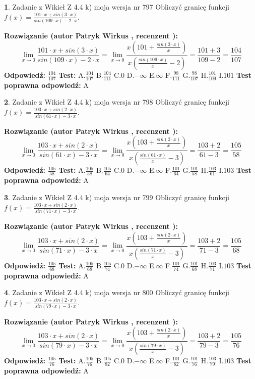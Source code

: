 \documentclass[12pt, a4paper]{article}
\theoremstyle{definition} %
\newtheorem{zad}{}
\newcommand{\zadStart}[1]{\begin{zad}#1\newline}
\newcommand{\zadStop}{\end{zad}}
\newcommand{\rozwStart}[2]{\noindent \textbf{Rozwiązanie (autor #1 , recenzent #2): }\newline}
\newcommand{\rozwStop}{\newline}
\newcommand{\odpStart}{\noindent \textbf{Odpowiedź:}\newline}
\newcommand{\odpStop}{\newline}
\newcommand{\testStart}{\noindent \textbf{Test:}\newline}
\newcommand{\testStop}{\newline}
\newcommand{\kluczStart}{\noindent \textbf{Test poprawna odpowiedź:}\newline}
\newcommand{\kluczStop}{\newline}
\begin{document}
\zadStart{Zadanie z Wikieł Z 4.4 k) moja wersja nr 797}
Obliczyć granicę funkcji $f(x)=\frac{101\cdot x +sin(3\cdot x)}{sin(109\cdot x) -2\cdot x}$.
\zadStop
\rozwStart{Patryk Wirkus}{}
$$\lim\limits_{x\to 0}\frac{101\cdot x +sin(3\cdot x)}{sin(109\cdot x) -2\cdot x}
=\lim\limits_{x\to 0}\frac{x(101+\frac{sin(3\cdot x)}{x})}{x(\frac{sin(109\cdot x)}{x}-2)}
=\frac{101+3}{109-2} = \frac{104}{107}$$
\rozwStop
\odpStart
$\frac{104}{107}$
\odpStop
\testStart
A.$\frac{104}{107}$
B.$\frac{104}{111}$
C.$0$
D.$-\infty$
E.$\infty$
F.$\frac{98}{111}$
G.$\frac{98}{107}$
H.$\frac{101}{109}$
I.$101$
\testStop
\kluczStart
A
\kluczStop



\zadStart{Zadanie z Wikieł Z 4.4 k) moja wersja nr 798}
Obliczyć granicę funkcji $f(x)=\frac{103\cdot x +sin(2\cdot x)}{sin(61\cdot x) -3\cdot x}$.
\zadStop
\rozwStart{Patryk Wirkus}{}
$$\lim\limits_{x\to 0}\frac{103\cdot x +sin(2\cdot x)}{sin(61\cdot x) -3\cdot x}
=\lim\limits_{x\to 0}\frac{x(103+\frac{sin(2\cdot x)}{x})}{x(\frac{sin(61\cdot x)}{x}-3)}
=\frac{103+2}{61-3} = \frac{105}{58}$$
\rozwStop
\odpStart
$\frac{105}{58}$
\odpStop
\testStart
A.$\frac{105}{58}$
B.$\frac{105}{64}$
C.$0$
D.$-\infty$
E.$\infty$
F.$\frac{101}{64}$
G.$\frac{101}{58}$
H.$\frac{103}{61}$
I.$103$
\testStop
\kluczStart
A
\kluczStop



\zadStart{Zadanie z Wikieł Z 4.4 k) moja wersja nr 799}
Obliczyć granicę funkcji $f(x)=\frac{103\cdot x +sin(2\cdot x)}{sin(71\cdot x) -3\cdot x}$.
\zadStop
\rozwStart{Patryk Wirkus}{}
$$\lim\limits_{x\to 0}\frac{103\cdot x +sin(2\cdot x)}{sin(71\cdot x) -3\cdot x}
=\lim\limits_{x\to 0}\frac{x(103+\frac{sin(2\cdot x)}{x})}{x(\frac{sin(71\cdot x)}{x}-3)}
=\frac{103+2}{71-3} = \frac{105}{68}$$
\rozwStop
\odpStart
$\frac{105}{68}$
\odpStop
\testStart
A.$\frac{105}{68}$
B.$\frac{105}{74}$
C.$0$
D.$-\infty$
E.$\infty$
F.$\frac{101}{74}$
G.$\frac{101}{68}$
H.$\frac{103}{71}$
I.$103$
\testStop
\kluczStart
A
\kluczStop



\zadStart{Zadanie z Wikieł Z 4.4 k) moja wersja nr 800}
Obliczyć granicę funkcji $f(x)=\frac{103\cdot x +sin(2\cdot x)}{sin(79\cdot x) -3\cdot x}$.
\zadStop
\rozwStart{Patryk Wirkus}{}
$$\lim\limits_{x\to 0}\frac{103\cdot x +sin(2\cdot x)}{sin(79\cdot x) -3\cdot x}
=\lim\limits_{x\to 0}\frac{x(103+\frac{sin(2\cdot x)}{x})}{x(\frac{sin(79\cdot x)}{x}-3)}
=\frac{103+2}{79-3} = \frac{105}{76}$$
\rozwStop
\odpStart
$\frac{105}{76}$
\odpStop
\testStart
A.$\frac{105}{76}$
B.$\frac{105}{82}$
C.$0$
D.$-\infty$
E.$\infty$
F.$\frac{101}{82}$
G.$\frac{101}{76}$
H.$\frac{103}{79}$
I.$103$
\testStop
\kluczStart
A
\kluczStop
\end{document}
